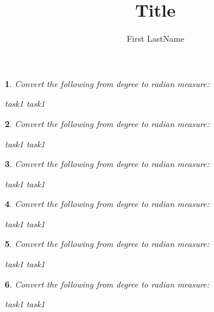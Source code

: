\documentclass{article}
\title{Title}
\author{First LastName}
\newtheorem{question}{}
\begin{document}
\begin{question}
    Convert the following from degree to radian measure:
    \begin{tasks}
        \task task1
        \vspace{7 cm}
        \task task1
        \vspace{7 cm}
    \end{tasks}
\end{question}

\begin{question}
    Convert the following from degree to radian measure:
    \begin{tasks}
        \task task1
        \vspace{7 cm}
        \task task1
        \vspace{7 cm}
    \end{tasks}
\end{question}

\begin{question}
    Convert the following from degree to radian measure:
    \begin{tasks}
        \task task1
        \vspace{7 cm}
        \task task1
        \vspace{7 cm}
    \end{tasks}
\end{question}

\begin{question}
    Convert the following from degree to radian measure:
    \begin{tasks}
        \task task1
        \vspace{7 cm}
        \task task1
        \vspace{7 cm}
    \end{tasks}
\end{question}

\begin{question}
    Convert the following from degree to radian measure:
    \begin{tasks}
        \task task1
        \vspace{7 cm}
        \task task1
        \vspace{7 cm}
    \end{tasks}
\end{question}

\begin{question}
    Convert the following from degree to radian measure:
    \begin{tasks}
        \task task1
        \vspace{7 cm}
        \task task1
        \vspace{7 cm}
    \end{tasks}
\end{question}
\end{document}
